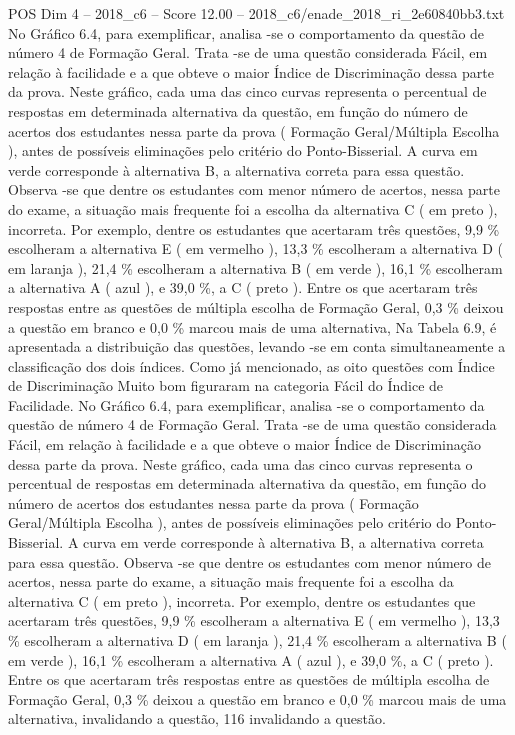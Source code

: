 \begin{textsample}{POS Dim 4 – 2018\_c6 – Score 12.00 – 2018\_c6/enade\_2018\_ri\_2e60840bb3.txt}
No Gráfico 6.4, para exemplificar, analisa -se o comportamento da questão de número 4 de Formação Geral.
Trata -se de uma questão considerada Fácil, em relação à facilidade e a que obteve o maior Índice de Discriminação dessa parte da prova.
Neste gráfico, cada uma das cinco curvas representa o percentual de respostas em determinada alternativa da questão, em função do número de acertos dos estudantes nessa parte da prova ( Formação Geral/Múltipla Escolha ), antes de possíveis eliminações pelo critério do Ponto-Bisserial.
A curva em verde corresponde à alternativa B, a alternativa correta para essa questão.
Observa -se que dentre os estudantes com menor número de acertos, nessa parte do exame, a situação mais frequente foi a escolha da alternativa C ( em preto ), incorreta.
Por exemplo, dentre os estudantes que acertaram três questões, 9,9 \% escolheram a alternativa E ( em vermelho ), 13,3 \% escolheram a alternativa D ( em laranja ), 21,4 \% escolheram a alternativa B ( em verde ), 16,1 \% escolheram a alternativa A ( azul ), e 39,0 \%, a C ( preto ).
Entre os que acertaram três respostas entre as questões de múltipla escolha de Formação Geral, 0,3 \% deixou a questão em branco e 0,0 \% marcou mais de uma alternativa, Na Tabela 6.9, é apresentada a distribuição das questões, levando -se em conta simultaneamente a classificação dos dois índices.
Como já mencionado, as oito questões com Índice de Discriminação Muito bom figuraram na categoria Fácil do Índice de Facilidade.
No Gráfico 6.4, para exemplificar, analisa -se o comportamento da questão de número 4 de Formação Geral.
Trata -se de uma questão considerada Fácil, em relação à facilidade e a que obteve o maior Índice de Discriminação dessa parte da prova.
Neste gráfico, cada uma das cinco curvas representa o percentual de respostas em determinada alternativa da questão, em função do número de acertos dos estudantes nessa parte da prova ( Formação Geral/Múltipla Escolha ), antes de possíveis eliminações pelo critério do Ponto-Bisserial.
A curva em verde corresponde à alternativa B, a alternativa correta para essa questão.
Observa -se que dentre os estudantes com menor número de acertos, nessa parte do exame, a situação mais frequente foi a escolha da alternativa C ( em preto ), incorreta.
Por exemplo, dentre os estudantes que acertaram três questões, 9,9 \% escolheram a alternativa E ( em vermelho ), 13,3 \% escolheram a alternativa D ( em laranja ), 21,4 \% escolheram a alternativa B ( em verde ), 16,1 \% escolheram a alternativa A ( azul ), e 39,0 \%, a C ( preto ).
Entre os que acertaram três respostas entre as questões de múltipla escolha de Formação Geral, 0,3 \% deixou a questão em branco e 0,0 \% marcou mais de uma alternativa, invalidando a questão, 116 invalidando a questão.

\end{textsample}
